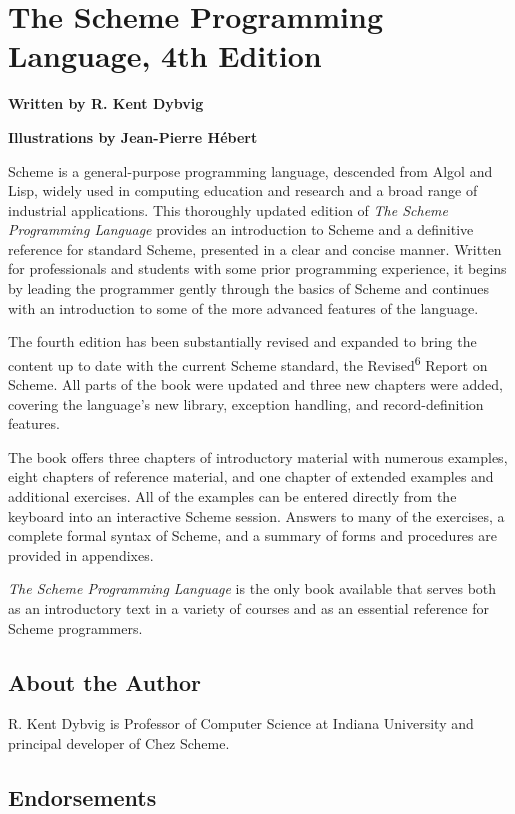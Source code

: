 \chapter*{The Scheme Programming Language, 4th Edition}

\textbf{\huge Written by R. Kent Dybvig}

\textbf{\Large Illustrations by Jean-Pierre Hébert}

 Scheme is a general-purpose programming language, descended from Algol and Lisp, widely used in computing education and research and a broad range of industrial applications. This thoroughly updated edition of \textit{The Scheme Programming Language} provides an introduction to Scheme and a definitive reference for standard Scheme, presented in a clear and concise manner. Written for professionals and students with some prior programming experience, it begins by leading the programmer gently through the basics of Scheme and continues with an introduction to some of the more advanced features of the language.

The fourth edition has been substantially revised and expanded to bring the content up to date with the current Scheme standard, the Revised\textsuperscript{6} Report on Scheme. All parts of the book were updated and three new chapters were added, covering the language's new library, exception handling, and record-definition features.

The book offers three chapters of introductory material with numerous examples, eight chapters of reference material, and one chapter of extended examples and additional exercises. All of the examples can be entered directly from the keyboard into an interactive Scheme session. Answers to many of the exercises, a complete formal syntax of Scheme, and a summary of forms and procedures are provided in appendixes.

\textit{The Scheme Programming Language} is the only book available that serves both as an introductory text in a variety of courses and as an essential reference for Scheme programmers. 

\section*{About the Author}

R. Kent Dybvig is Professor of Computer Science at Indiana University and principal developer of Chez Scheme. 

\section*{Endorsements}


